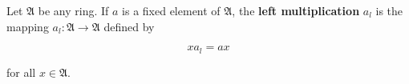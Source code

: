 Let $\mathfrak{A}$ be any ring. If $a$ is a fixed element of $\mathfrak{A}$, the \textbf{left multiplication} $a_l$ is the mapping $a_l: \mathfrak{A} \to \mathfrak{A}$ defined by

$$x a_l = ax$$

for all $x \in \mathfrak{A}$.
